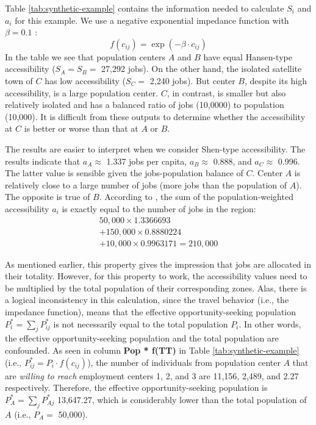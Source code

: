 \documentclass[]{elsarticle} %
\begin{document}
\begin{table}[ht]
\end{table}
 

Table \ref{tab:synthetic-example} contains the information needed to
calculate \(S_i\) and \(a_i\) for this example. We use a negative
exponential impedance function with \(\beta=0.1\) \citep[see][footnote
(5)]{shen1998}: \[
f(c_{ij}) = \exp(-\beta\cdot c_{ij})
\] In the table we see that population centers \(A\) and \(B\) have
equal Hansen-type accessibility (\(S_A = S_B=\) 27,292 jobs). On the
other hand, the isolated satellite town of \(C\) has low accessibility
(\(S_C=\) 2,240 jobs). But center \(B\), despite its high accessibility,
is a large population center. \(C\), in contrast, is smaller but also
relatively isolated and has a balanced ratio of jobs (10,0000) to
population (10,000). It is difficult from these outputs to determine
whether the accessibility at \(C\) is better or worse than that at \(A\)
or \(B\).

The results are easier to interpret when we consider Shen-type
accessibility. The results indicate that \(a_A \approx\) 1.337 jobs per
capita, \(a_B \approx\) 0.888, and \(a_C\approx\) 0.996. The latter
value is sensible given the jobs-population balance of \(C\). Center
\(A\) is relatively close to a large number of jobs (more jobs than the
population of \(A\)). The opposite is true of \(B\). According to
\citet{shen1998}, the sum of the population-weighted accessibility
\(a_i\) is exactly equal to the number of jobs in the region: \[
\begin{array}{l}
50,000\times 1.3366693 \\
+ 150,000 \times 0.8880224 \\
+ 10,000 \times 0.9963171 = 210,000
\end{array}
\]

As mentioned earlier, this property gives the impression that jobs are
allocated in their totality. However, for this property to work, the
accessibility values need to be multiplied by the total population of
their corresponding zones. Alas, there is a logical inconsistency in
this calculation, since the travel behavior (i.e., the impedance
function), means that the effective opportunity-seeking population
\(P_i^* = \sum_j P_{ij}^*\) is not necessarily equal to the total
population \(P_i\). In other words, the effective opportunity-seeking
population and the total population are confounded. As seen in column
\textbf{Pop * f(TT)} in Table \ref{tab:synthetic-example} (i.e.,
\(P_{ij}^* = P_i\cdot f(c_{ij})\)), the number of individuals from
population center \(A\) that are \emph{willing to reach} employment
centers 1, 2, and 3 are 11,156, 2,489, and 2.27 respectively. Therefore,
the effective opportunity-seeking population is
\(P_A^* = \sum_jP_{Aj}^*\) 13,647.27, which is considerably lower than
the total population of \(A\) (i.e., \(P_A=\) 50,000).
\end{document}
